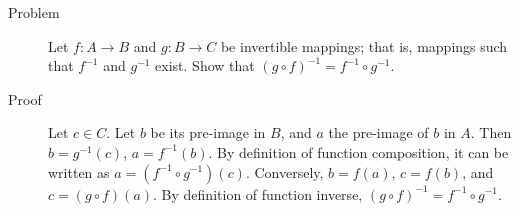 \begin{description}
\item[Problem] Let $f : A \rightarrow B$ and $g : B \rightarrow C$ be
invertible mappings; that is, mappings such that $f^{-1}$ and $g^{-1}$ exist.
Show that $(g \circ f)^{-1} = f^{-1} \circ g^{-1}$.
\item[Proof] Let $c \in C$. Let $b$ be its pre-image in $B$, and $a$ the
pre-image of $b$ in $A$. Then $b = g^{-1} (c)$, $a = f^{-1} (b)$. By definition
of function composition, it can be written as $a = \left(f^{-1} \circ
g^{-1}\right)(c)$. Conversely, $b = f(a)$, $c = f(b)$, and $c = (g
\circ f)(a)$. By definition of function inverse, $(g \circ f)^{-1} =
f^{-1} \circ g^{-1}$.
\end{description}
